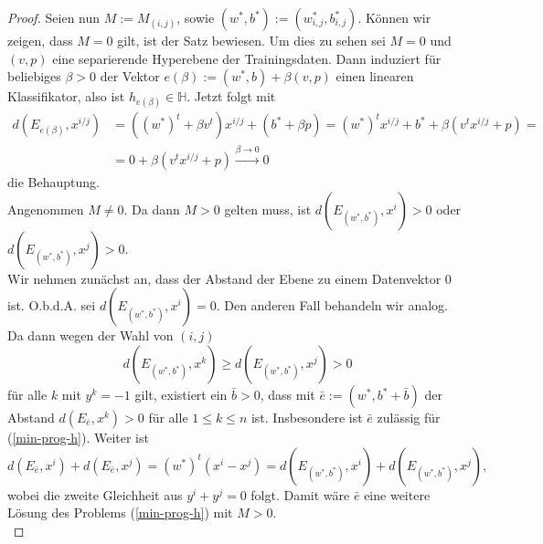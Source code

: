 \begin{proof}
	Seien nun $M := M_{(i,j)}$, sowie  $(w^*,b^*) := (w_{i,j}^*,b_{i,j}^*)$. Können wir zeigen, dass $M=0$ gilt, ist der Satz bewiesen.
	Um dies zu sehen sei $M=0$ und $(v,p)$ eine separierende Hyperebene der Trainingsdaten. Dann induziert für beliebiges $\beta > 0$ der Vektor $e(\beta) := (w^*,b)+ \beta (v,p)$ einen linearen Klassifikator, also ist $h_{e(\beta)} \in \mathbb{H}$. Jetzt folgt mit
	$$
	\begin{aligned}
	d(E_{e(\beta)},x^{i/j}) &= ((w^*)^t+\beta v^t) x^{i/j} + (b^*+\beta p) = (w^*)^t x^{i/j} + b^* + \beta (v^t x^{i/j} + p) = \\
	&= 0 + \beta (v^t x^{i/j} + p) \xrightarrow{\beta \rightarrow 0} 0
	\end{aligned}
	$$ 
	die Behauptung. \\
	
	Angenommen $M \neq 0$. Da dann $M>0$ gelten muss, ist $d(E_{(w^*,b^*)},x^i) > 0$ oder $d(E_{(w^*,b^*)},x^j) > 0$. \\
	
	Wir nehmen zunächst an, dass der Abstand der Ebene zu einem Datenvektor $0$ ist. O.b.d.A. sei $d(E_{(w^*,b^*)},x^i) = 0$. Den anderen Fall behandeln wir analog. Da dann wegen der Wahl von $(i,j)$
	$$
	d(E_{(w^*,b^*)},x^k) \geq d(E_{(w^*,b^*)},x^j) > 0
	$$ 
	für alle $k$ mit $y^k = -1$ gilt, existiert ein $\bar{b}>0$, dass mit $\bar{e} := (w^*, b^*+ \bar{b})$ der Abstand  $d(E_{\bar{e}}, x^k) > 0$ für alle $1 \leq k \leq n$ ist. Insbesondere ist $\bar{e}$ zulässig für (\ref{min-prog-h}). Weiter ist 
	$$
	d(E_{\bar{e}},x^i) + d(E_{\bar{e}},x^j) 
	 = (w^*)^t(x^i-x^j) 
     = d(E_{(w^*,b^*)},x^i) +d(E_{(w^*,b^*)},x^j),
	$$
	wobei die zweite Gleichheit aus  $y^i+y^j=0$ folgt. 
	Damit wäre $\bar{e}$ eine weitere Lösung des Problems (\ref{min-prog-h}) mit $M > 0$. \\
	

\end{proof}
